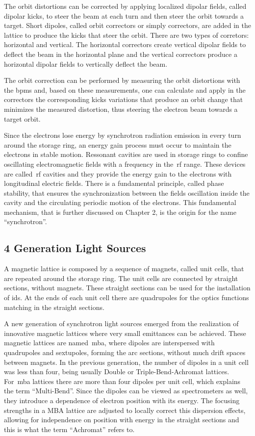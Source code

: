 The orbit distortions can be corrected by applying localized dipolar fields, called dipolar kicks, to steer the beam at each turn and then steer the orbit towards a target. Short dipoles, called orbit correctors or simply correctors, are added in the lattice to produce the kicks that steer the orbit. There are two types of corretors: horizontal and vertical. The horizontal correctors create vertical dipolar fields to deflect the beam in the horizontal plane and the vertical correctors produce a horizontal dipolar fields to vertically deflect the beam.

The orbit correction can be performed by measuring the orbit distortions with the \glspl{bpm} and, based on these measurements, one can calculate and apply in the correctors the corresponding kicks variations that produce an orbit change that minimizes the measured distortion, thus steering the electron beam towards a target orbit.

Since the electrons lose energy by synchrotron radiation emission in every turn around the storage ring, an energy gain process must occur to maintain the electrons in stable motion. Ressonant cavities are used in storage rings to confine oscillating electromagnetic fields with a frequency in the~\gls{rf} range. These devices are called~\gls{rf} cavities and they provide the energy gain to the electrons with longitudinal electric fields. There is a fundamental principle, called phase stability, that ensures the synchronization between the fields oscillation inside the cavity and the circulating periodic motion of the electrons. This fundamental mechanism, that is further discussed on Chapter 2, is the origin for the name ``synchrotron''.
\subsection{4 Generation Light Sources}\label{subsec:fourth_generation}
A magnetic lattice is composed by a sequence of magnets, called unit cells, that are repeated around the storage ring. The unit cells are connected by straight sections, without magnets. These straight sections can be used for the installation of \glspl{id}. At the ends of each unit cell there are quadrupoles for the optics functions matching in the straight sections.

A new generation of synchrotron light sources emerged from the realization of innovative magnetic lattices where very small emittances can be achieved. These magnetic lattices are named~\gls{mba}, where dipoles are interspersed with quadrupoles and sextupoles, forming the arc sections, without much drift spaces between magnets. In the previous generation, the number of dipoles in a unit cell was less than four, being usually Double or Triple-Bend-Achromat lattices. For~\gls{mba} lattices there are more than four dipoles per unit cell, which explains the term ``Multi-Bend''. Since the dipoles can be viewed as spectrometers as well, they introduce a dependence of electron position with its energy. The focusing strengths in a MBA lattice are adjusted to locally correct this dispersion effects, allowing for independence on position with energy in the straight sections and this is what the term ``Achromat'' refers to. 

